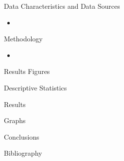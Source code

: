 \documentclass[12pt]{beamer}
\begin{document}
\begin{frame}[allowframebreaks]{Data Characteristics and Data Sources}
	\begin{itemize}
		\item
	\end{itemize}
\end{frame}

\begin{frame}[allowframebreaks]{Methodology}
	\begin{itemize}
		\item
	\end{itemize}

\end{frame}

\begin{frame}[allowframebreaks]{Results Figures}

\end{frame}

\begin{frame}[allowframebreaks]{Descriptive Statistics}

\end{frame}

\begin{frame}[allowframebreaks]{Results}

\end{frame}

\begin{frame}[allowframebreaks]{Graphs}

\end{frame}

\begin{frame}[allowframebreaks]{Conclusions}

\end{frame}
\begin{frame}[allowframebreaks]{Bibliography}
	\printbibliography
\end{frame}
\end{document}
